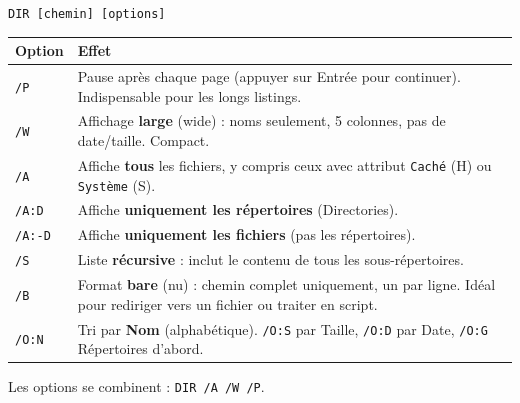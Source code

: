 \documentclass[11pt]{article}
\begin{document}
\begin{propriete}
\texttt{DIR [chemin] [options]}
\begin{center}
\begin{tabularx}{\linewidth}{|l|X|}\hline
\rowcolor{popblueL}
\textbf{Option} & \textbf{Effet} \\\hline
\texttt{/P} & Pause après chaque page (appuyer sur Entrée pour continuer). Indispensable pour les longs listings. \\\hline
\texttt{/W} & Affichage \textbf{large} (wide) : noms seulement, 5 colonnes, pas de date/taille. Compact. \\\hline
\texttt{/A} & Affiche \textbf{tous} les fichiers, y compris ceux avec attribut \texttt{Caché} (H) ou \texttt{Système} (S). \\\hline
\texttt{/A:D} & Affiche \textbf{uniquement les répertoires} (Directories). \\\hline
\texttt{/A:-D} & Affiche \textbf{uniquement les fichiers} (pas les répertoires). \\\hline
\texttt{/S} & Liste \textbf{récursive} : inclut le contenu de tous les sous-répertoires. \\\hline
\texttt{/B} & Format \textbf{bare} (nu) : chemin complet uniquement, un par ligne. Idéal pour rediriger vers un fichier ou traiter en script. \\\hline
\texttt{/O:N} & Tri par \textbf{Nom} (alphabétique). \texttt{/O:S} par Taille, \texttt{/O:D} par Date, \texttt{/O:G} Répertoires d'abord. \\\hline
\end{tabularx}
\end{center}
Les options se combinent : \texttt{DIR /A /W /P}.
\end{propriete}
\end{document}
